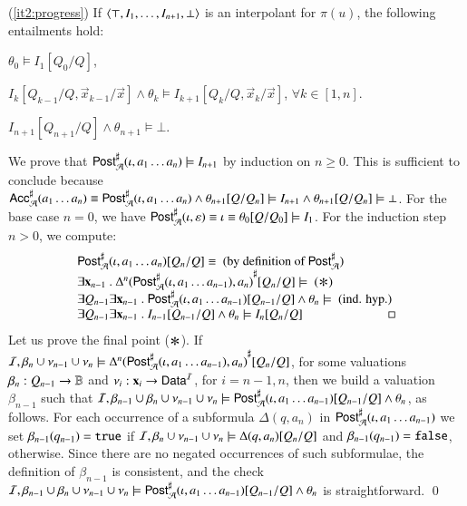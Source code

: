 \documentclass[10pt,conference,letterpaper,twocolumn]{IEEEtran}
\begin{document}
{  (\ref{it2:progress}) If $\left\langle \top,I_1,\dots,I_{n+1},\bot \right\rangle$ is an
    interpolant for $\pi(u)$, the following entailments hold: \begin{compactitem}
    \item $\theta_0 \models I_1[Q_0/Q]$, 
    \item $I_k[Q_{k-1}/Q,\vec{x}_{k-1}/\vec{x}] \wedge \theta_k \models I_{k+1}[Q_k/Q,\vec{x}_k/\vec{x}]$, $\forall k\in[1,n]$. 
    \item $I_{n+1}[Q_{n+1}/Q] \wedge \theta_{n+1} \models \bot$. 
    \end{compactitem}
    We prove that ${\mathsf{Post}}^\sharp_{\mathcal{A}}(\iota,a_1\ldots a_n) \models I_{n+1}$
    by induction on $n \geq 0$. This is sufficient to conclude because
    ${\mathsf{Acc}}^\sharp_{\mathcal{A}}(a_1\ldots a_n) \equiv {\mathsf{Post}}^\sharp_{\mathcal{A}}(\iota,a_1\ldots
    a_n) \wedge \theta_{n+1}[Q/Q_n] \models I_{n+1} \wedge
    \theta_{n+1}[Q/Q_n] \models \bot$. For the base case $n=0$, we
    have ${\mathsf{Post}}^\sharp_{\mathcal{A}}(\iota,\varepsilon) \equiv \iota \equiv
    \theta_0[Q/Q_0] \models I_1$. For the induction step $n>0$, we
    compute:
    \[\begin{array}{l}
    \AbsPost{\A}(\iota,a_1\ldots a_n)[Q_n/Q] \equiv \text{ (by definition of $\AbsPost{\A}$)} \\
    \exists \vec{x}_{n-1} ~.~ \abs{\Delta^n(\AbsPost{\A}(\iota,a_1\ldots a_{n-1}),a_n)}[Q_n/Q] \models \text{ ($\Asterisk$)} \\
    \exists Q_{n-1}  \exists \vec{x}_{n-1} ~.~ \AbsPost{\A}(\iota,a_1\ldots a_{n-1})[Q_{n-1}/Q] \wedge \theta_n \models \text{ (ind. hyp.) } \\
    \exists Q_{n-1}  \exists \vec{x}_{n-1} ~.~ I_{n-1}[Q_{n-1}/Q] \wedge \theta_n \models I_n[Q_n/Q]  \hfill\text{\qed}
    \end{array}\]
   Let us prove the final point ($\Asterisk$). If
   $\mathcal{I},\beta_n\cup\nu_{n-1}\cup\nu_n \models
   {\Delta^n({\mathsf{Post}}^\sharp_{\mathcal{A}}(\iota,a_1\ldots a_{n-1}),a_n)}^\sharp[Q_{n}/Q]$,
   for some valuations $\beta_{n} : Q_{n-1} \rightarrow \mathbb{B}$ and
   $\nu_i : \mathbf x_i \rightarrow \mathsf{Data}^{\mathcal{I}}$, for $i=n-1,n$, then we
   build a valuation $\beta_{n-1}$ such that
   $\mathcal{I},\beta_{n-1}\cup\beta_n \cup \nu_{n-1}\cup\nu_n \models
   {\mathsf{Post}}^\sharp_{\mathcal{A}}(\iota,a_1\ldots a_{n-1})[Q_{n-1}/Q] \wedge \theta_n$,
   as follows. For each occurrence of a subformula $\Delta(q,a_n)$ in
   ${\mathsf{Post}}^\sharp_{\mathcal{A}}(\iota,a_1\ldots a_{n-1})$ we set
   $\beta_{n-1}(q_{n-1}) = \mathtt{true}$ if $\mathcal{I},\beta_n\cup\nu_{n-1}\cup\nu_n
   \models \Delta(q,a_n)[Q_n/Q]$ and $\beta_{n-1}(q_{n-1}) = \mathtt{false}$,
   otherwise. Since there are no negated occurrences of such
   subformulae, the definition of $\beta_{n-1}$ is consistent, and the
   check $\mathcal{I},\beta_{n-1}\cup\beta_n \cup \nu_{n-1}\cup\nu_n \models
   {\mathsf{Post}}^\sharp_{\mathcal{A}}(\iota,a_1\ldots a_{n-1})[Q_{n-1}/Q] \wedge \theta_n$
   is straightforward. \qed}
\end{document}
